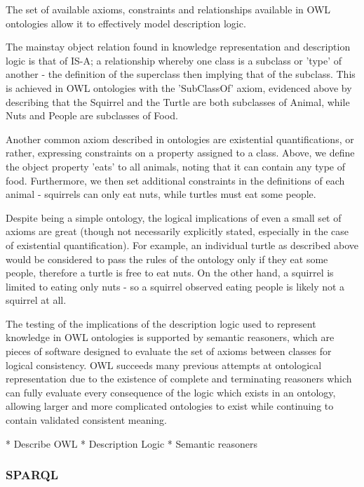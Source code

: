 \documentclass{article}
\begin{document}
The set of available axioms, constraints and relationships available in OWL
ontologies allow it to effectively model description logic\cite{desclogic}. 

The mainstay object relation found in knowledge representation and description
logic is that of IS-A; a relationship whereby one class is a subclass or 'type'
of another - the definition of the superclass then implying that of the
subclass. This is achieved in OWL ontologies with the 'SubClassOf' axiom,
evidenced above by describing that the Squirrel and the Turtle are both
subclasses of Animal, while Nuts and People are subclasses of Food.

Another common axiom described in ontologies are existential quantifications, or
rather, expressing constraints on a property assigned to a class. Above, we
define the object property 'eats' to all animals, noting that it can contain any
type of food. Furthermore, we then set additional constraints in the definitions
of each animal - squirrels can only eat nuts, while turtles must eat some
people.

Despite being a simple ontology, the logical implications of even a small set of
axioms are great (though not necessarily explicitly stated, especially in the
case of existential quantification). For example, an individual turtle as described 
above would be considered to pass the rules of the ontology only if they eat some 
people, therefore a turtle is free to eat nuts. On the other hand, a squirrel is limited
to eating only nuts - so a squirrel observed eating people is likely not a
squirrel at all.

The testing of the implications of the description logic used to represent
knowledge in OWL ontologies is supported by semantic reasoners, which are 
pieces of software designed to evaluate the set of axioms between classes for 
logical consistency. OWL succeeds many previous attempts at ontological 
representation due to the existence of complete and terminating reasoners 
which can fully evaluate every consequence of the logic which exists in an 
ontology, allowing larger and more complicated ontologies to exist while 
continuing to contain validated consistent meaning.

* Describe OWL
* Description Logic
* Semantic reasoners

\subsubsection{SPARQL}
\end{document}
